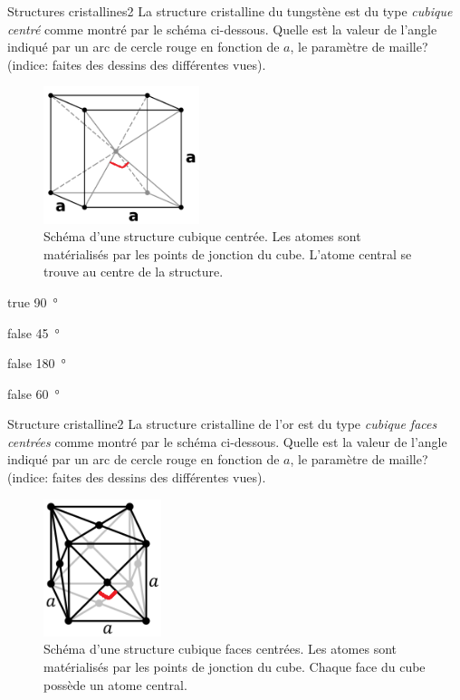         \begin{question}{31}{Structures cristallines}{2}{}
            La structure cristalline du tungstène est du type \emph{cubique centré} comme montré par le schéma ci-dessous. Quelle est la valeur de l'angle indiqué par un arc de cercle rouge en fonction de $a$, le paramètre de maille? (indice: faites des dessins des différentes vues).
            \begin{figure}
                \centering
                \includegraphics[height = 4cm]{Antoine/Figures_Antoine/BCC2.png}
                \caption{Schéma d'une structure cubique centrée. Les atomes sont matérialisés par les points de jonction du cube. L'atome central se trouve au centre de la structure.}
            \end{figure}
        \end{question}
        \begin{reponses} 
            \item[true] \SI{90}{\degree}
            \item[false] \SI{45}{\degree} 
            \item[false] \SI{180}{\degree}
    	    \item[false] \SI{60}{\degree}
        \end{reponses}
        \begin{question}{31}{Structure cristalline}{2}{}
            La structure cristalline de l'or est du type \emph{cubique faces centrées} comme montré par le schéma ci-dessous. Quelle est la valeur de l'angle indiqué par un arc de cercle rouge en fonction de $a$, le paramètre de maille? (indice: faites des dessins des différentes vues).
            \begin{figure}
                \centering
                \includegraphics[height = 4cm]{Antoine/Figures_Antoine/FCC2.png}
                \caption{Schéma d'une structure cubique faces centrées. Les atomes sont matérialisés par les points de jonction du cube. Chaque face du cube possède un atome central.}
            \end{figure}
        \end{question}
